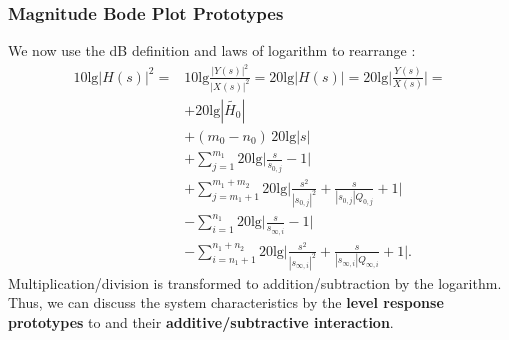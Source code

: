 \subsubsection{Magnitude Bode Plot Prototypes}
We now use the dB definition and laws of logarithm to rearrange :
\begin{align}
10 \text{lg} |H(s)|^2 =
& 10 \text{lg} \frac{|Y(s)|^2}{|X(s)|^2} =
20 \text{lg} |H(s)| = 20 \text{lg} \bigg|\frac{Y(s)}{X(s)}\bigg| =\nonumber\\
\label{eq:Hs_sorted_for_Bode_dB_gain}
& +20 \text{lg} |\tilde{H_0}|\\
\label{eq:Hs_sorted_for_Bode_dB_origin}
& +(m_0-n_0) \, 20 \text{lg} |s|\\
\label{eq:Hs_sorted_for_Bode_dB_zero}
& +\sum\limits_{j=1}^{m_1} 20 \text{lg}  \bigg|\frac{s}{s_{0,j}}-1\bigg|\\
\label{eq:Hs_sorted_for_Bode_dB_cczero}
& +\sum\limits_{j=m_1+1}^{m_1+m_2} 20 \text{lg} \bigg|\frac{s^2}{|s_{0,j}|^2} + \frac{s}{|s_{0,j}| Q_{0,j}} + 1\bigg|\\
\label{eq:Hs_sorted_for_Bode_dB_pole}
&-\sum\limits_{i=1}^{n_1} 20 \text{lg} \bigg|\frac{s}{s_{\infty,i}}-1\bigg|\\
\label{eq:Hs_sorted_for_Bode_dB_ccpole}
&-\sum\limits_{i=n_1+1}^{n_1+n_2} 20 \text{lg} \bigg|\frac{s^2}{|s_{\infty,i}|^2} + \frac{s}{|s_{\infty,i}| Q_{\infty,i}} + 1\bigg|.
\end{align}
%
Multiplication/division is transformed to addition/subtraction by the logarithm.
Thus, we can discuss the system characteristics by the \textbf{level response prototypes}
 to  and
their \textbf{additive/subtractive interaction}.

